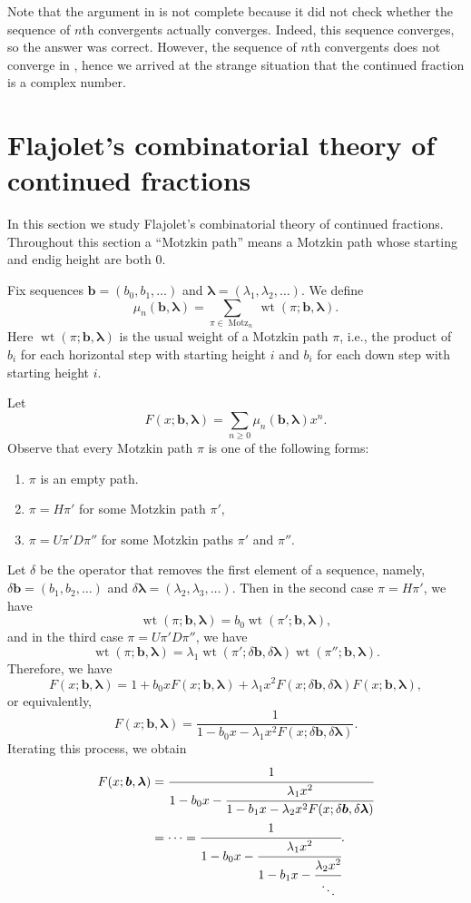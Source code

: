 \documentclass[oneside]{book}
\numberwithin{equation}{section}
\theoremstyle{definition}
\newcommand\Motz{\operatorname{Motz}}
\newcommand\wt{\operatorname{wt}}
\renewcommand\vec[1]{\bm{#1}}
\newcommand\vb{\vec{b}}
\newcommand\vla{\vec{\lambda}}
\begin{document}
Note that the argument in  is not complete because it did
not check whether the sequence of \( n \)th convergents actually
converges. Indeed, this sequence converges, so the answer was correct.
However, the sequence of \( n \)th convergents does not converge in
, hence we arrived at the strange situation that the
continued fraction is a complex number.

\section{Flajolet's combinatorial theory of continued fractions}

In this section we study Flajolet's combinatorial theory of continued
fractions. Throughout this section a ``Motzkin path'' means a Motzkin
path whose starting and endig height are both \( 0 \).

Fix sequences \( \vb = (b_0, b_1,\dots) \) and
\( \vla = (\lambda_1, \lambda_2,\dots) \).
We define
\[
  \mu_n(\vb, \vla) = \sum_{\pi\in \Motz_n}  \wt(\pi; \vb,\vla).
\]
Here \( \wt(\pi; \vb,\vla) \) is the usual weight of a Motzkin path
\( \pi \), i.e., the product of \( b_i \) for each horizontal step
with starting height \( i \) and \( b_i \) for each down step with
starting height \( i \).

Let
\[
  F(x;\vb,\vla) = \sum_{n\ge0} \mu_n(\vb, \vla) x^n. 
\]
Observe that every Motzkin path \( \pi \) is one of the following
forms:
\begin{enumerate}
\item \( \pi \) is an empty path.
\item \( \pi = H \pi' \) for some Motzkin path \( \pi' \),
\item \( \pi = U \pi' D \pi'' \) for some Motzkin paths \( \pi' \) and
  \( \pi'' \).
\end{enumerate}

Let \( \delta \) be the operator that removes the first element of a
sequence, namely, \( \delta \vb = (b_1,b_2,\dots) \) and
\( \delta \vla = (\lambda_2,\lambda_3,\dots) \).
Then in the second case \( \pi = H \pi' \), we have
\[
  \wt(\pi;\vb,\vla) = b_0 \wt(\pi';\vb,\vla),
\]
and in the third case \( \pi = U \pi' D \pi'' \), we have
\[
  \wt(\pi;\vb,\vla) = \lambda_1 \wt(\pi';\delta\vb,\delta\vla)
  \wt(\pi'';\vb,\vla).
\]
Therefore, we have
\[
  F(x;\vb,\vla) = 1 + b_0x F(x;\vb,\vla) + \lambda_1 x^2
  F(x;\delta\vb, \delta\vla) F(x;\vb,\vla),
\]
or equivalently,
\[
  F(x;\vb,\vla) = \frac{1}{1 - b_0x - \lambda_1 x^2 F(x;\delta\vb, \delta\vla)}.
\]
Iterating this process, we obtain
\begin{align}
\notag  F(x;\vb,\vla)
  &= \cfrac{1}{
    1-b_0x- \cfrac{\lambda_1x^2}{
    1 - b_1x - \lambda_2 x^2 F(x;\delta\vb, \delta\vla)}}\\
\label{eq:47}  &=  \cdots = \cfrac{1}{
    1-b_0x- \cfrac{\lambda_1x^2}{
      1-b_1x- \cfrac{\lambda_2x^2}{\ddots}}}.
\end{align}
\end{document}
